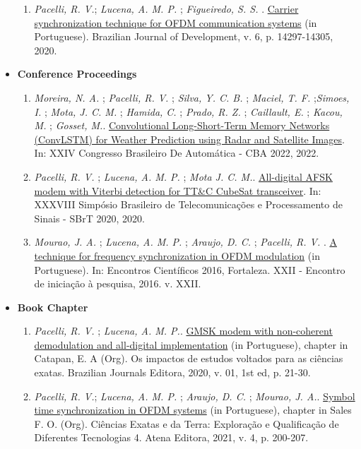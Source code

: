 \begin{itemize}[leftmargin=0.15in, label={}]
\begin{enumerate}[label=\textbf{J\arabic*.}, align=left, leftmargin=1.5cm]
        \item \textit{Pacelli, R. V.}; \textit{Lucena, A. M. P.} ; \textit{Figueiredo, S. S.} . \href{https://www.brazilianjournals.com/index.php/BRJD/article/view/7944/6883}{Carrier synchronization technique for OFDM communication systems} (in Portuguese). Brazilian Journal of Development, v. 6, p. 14297-14305, 2020.
    \end{enumerate}
    \item \textbf{Conference Proceedings}
    \begin{enumerate}[label=\textbf{C\arabic*.}, align=left, leftmargin=1.5cm]
        \item \textit{Moreira, N. A.} ; \textit{Pacelli, R. V.} ; \textit{Silva, Y. C. B.} ; \textit{Maciel, T. F.} ;\textit{Simoes, I.} ; \textit{Mota, J. C. M.} ; \textit{Hamida, C.} ; \textit{Prado, R. Z.} ; \textit{Caillault, E.} ; \textit{Kacou, M.} ; \textit{Gosset, M.}. \href{https://www.sba.org.br/cba2022/wp-content/uploads/artigos_cba2022/paper_2351.pdf}{Convolutional Long-Short-Term Memory Networks (ConvLSTM) for Weather Prediction using Radar and Satellite Images}. In: XXIV Congresso Brasileiro De Automática - CBA 2022, 2022.
        \item \textit{Pacelli, R. V.} ; \textit{Lucena, A. M. P.} ; \textit{Mota J. C. M.}. \href{http://www.sbrt.org.br/sbrt2020/papers/1570654898.pdf}{All-digital AFSK modem with Viterbi detection for TT\&C CubeSat transceiver}. In: XXXVIII Simpósio Brasileiro de Telecomunicações e Processamento de Sinais - SBrT 2020, 2020.
        \item \textit{Mourao, J. A.} ; \textit{Lucena, A. M. P.} ; \textit{Araujo, D. C.} ; \textit{Pacelli, R. V.} . \href{https://uol.unifor.br/oul/conteudosite/?cdConteudo=6946081}{A technique for frequency synchronization in OFDM modulation} (in Portuguese). In: Encontros Científicos 2016, Fortaleza. XXII - Encontro de iniciação à pesquisa, 2016. v. XXII.
    \end{enumerate}
    \item \textbf{Book Chapter}
    \begin{enumerate}[label=\textbf{BC\arabic*.}, align=left, leftmargin=1.5cm]
        \item \textit{Pacelli, R. V.} ; \textit{Lucena, A. M. P.}. \href{https://www.brazilianjournals.com.br/assets/ebooks/2c9747ceb79e967166c7d80a9ff8e1da.pdf}{GMSK modem with non-coherent demodulation and all-digital implementation} (in Portuguese), chapter in Catapan, E. A (Org). Os impactos de estudos voltados para as ciências exatas. Brazilian Journals Editora, 2020, v. 01, 1st ed, p. 21-30.
        \item \textit{Pacelli, R. V.}; \textit{Lucena, A. M. P.} ; \textit{Araujo, D. C.} ; \textit{Mourao, J. A.}. \href{https://www.finersistemas.com/atenaeditora/index.php/admin/api/ebookPDF/3771}{Symbol time synchronization in OFDM systems} (in Portuguese), chapter in Sales F. O. (Org). Ciências Exatas e da Terra: Exploração e Qualificação de Diferentes Tecnologias 4. Atena Editora, 2021, v. 4, p. 200-207.
    \end{enumerate}
\end{itemize}